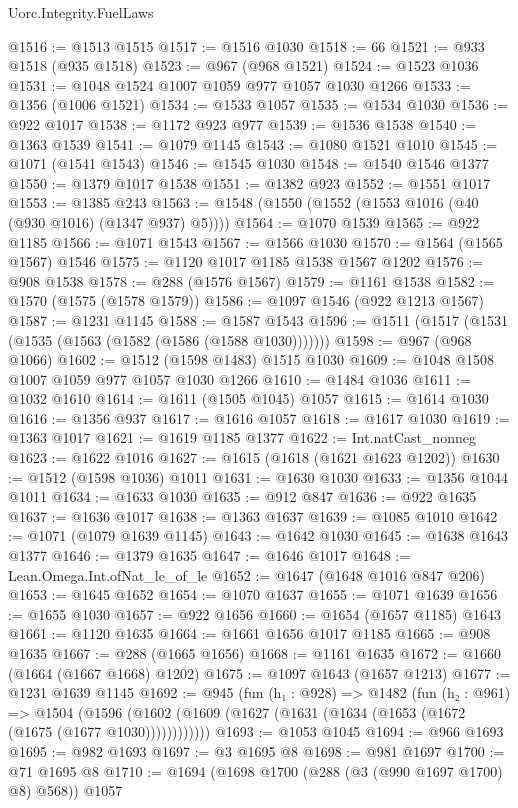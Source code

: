 \begin{lexlean}{Uorc.Integrity.FuelLaws}
\begin{coremodule}
@1516 := @1513 @1515
@1517 := @1516 @1030
@1518 := 66
@1521 := @933 @1518 (@935 @1518)
@1523 := @967 (@968 @1521)
@1524 := @1523 @1036
@1531 := @1048 @1524 @1007 @1059 @977 @1057 @1030 @1266
@1533 := @1356 (@1006 @1521)
@1534 := @1533 @1057
@1535 := @1534 @1030
@1536 := @922 @1017
@1538 := @1172 @923 @977
@1539 := @1536 @1538
@1540 := @1363 @1539
@1541 := @1079 @1145
@1543 := @1080 @1521 @1010
@1545 := @1071 (@1541 @1543)
@1546 := @1545 @1030
@1548 := @1540 @1546 @1377
@1550 := @1379 @1017 @1538
@1551 := @1382 @923
@1552 := @1551 @1017
@1553 := @1385 @243
@1563 := @1548 (@1550 (@1552 (@1553 @1016 (@40 (@930 @1016) (@1347 @937) @5))))
@1564 := @1070 @1539
@1565 := @922 @1185
@1566 := @1071 @1543
@1567 := @1566 @1030
@1570 := @1564 (@1565 @1567) @1546
@1575 := @1120 @1017 @1185 @1538 @1567 @1202
@1576 := @908 @1538
@1578 := @288 (@1576 @1567)
@1579 := @1161 @1538
@1582 := @1570 (@1575 (@1578 @1579))
@1586 := @1097 @1546 (@922 @1213 @1567)
@1587 := @1231 @1145
@1588 := @1587 @1543
@1596 := @1511 (@1517 (@1531 (@1535 (@1563 (@1582 (@1586 (@1588 @1030)))))))
@1598 := @967 (@968 @1066)
@1602 := @1512 (@1598 @1483) @1515 @1030
@1609 := @1048 @1508 @1007 @1059 @977 @1057 @1030 @1266
@1610 := @1484 @1036
@1611 := @1032 @1610
@1614 := @1611 (@1505 @1045) @1057
@1615 := @1614 @1030
@1616 := @1356 @937
@1617 := @1616 @1057
@1618 := @1617 @1030
@1619 := @1363 @1017
@1621 := @1619 @1185 @1377
@1622 := Int.natCast_nonneg
@1623 := @1622 @1016
@1627 := @1615 (@1618 (@1621 @1623 @1202))
@1630 := @1512 (@1598 @1036) @1011
@1631 := @1630 @1030
@1633 := @1356 @1044 @1011
@1634 := @1633 @1030
@1635 := @912 @847
@1636 := @922 @1635
@1637 := @1636 @1017
@1638 := @1363 @1637
@1639 := @1085 @1010
@1642 := @1071 (@1079 @1639 @1145)
@1643 := @1642 @1030
@1645 := @1638 @1643 @1377
@1646 := @1379 @1635
@1647 := @1646 @1017
@1648 := Lean.Omega.Int.ofNat_le_of_le
@1652 := @1647 (@1648 @1016 @847 @206)
@1653 := @1645 @1652
@1654 := @1070 @1637
@1655 := @1071 @1639
@1656 := @1655 @1030
@1657 := @922 @1656
@1660 := @1654 (@1657 @1185) @1643
@1661 := @1120 @1635
@1664 := @1661 @1656 @1017 @1185
@1665 := @908 @1635
@1667 := @288 (@1665 @1656)
@1668 := @1161 @1635
@1672 := @1660 (@1664 (@1667 @1668) @1202)
@1675 := @1097 @1643 (@1657 @1213)
@1677 := @1231 @1639 @1145
@1692 := @945
    (fun (h₁ : @928) =>
    @1482
      (fun (h₂ : @961) =>
      @1504 (@1596 (@1602 (@1609 (@1627 (@1631 (@1634 (@1653 (@1672 (@1675 (@1677 @1030))))))))))))
@1693 := @1053 @1045
@1694 := @966 @1693
@1695 := @982 @1693
@1697 := @3 @1695 @8
@1698 := @981 @1697
@1700 := @71 @1695 @8
@1710 := @1694 (@1698 @1700 (@288 (@3 (@990 @1697 @1700) @8) @568)) @1057

\end{coremodule}
\end{lexlean}
